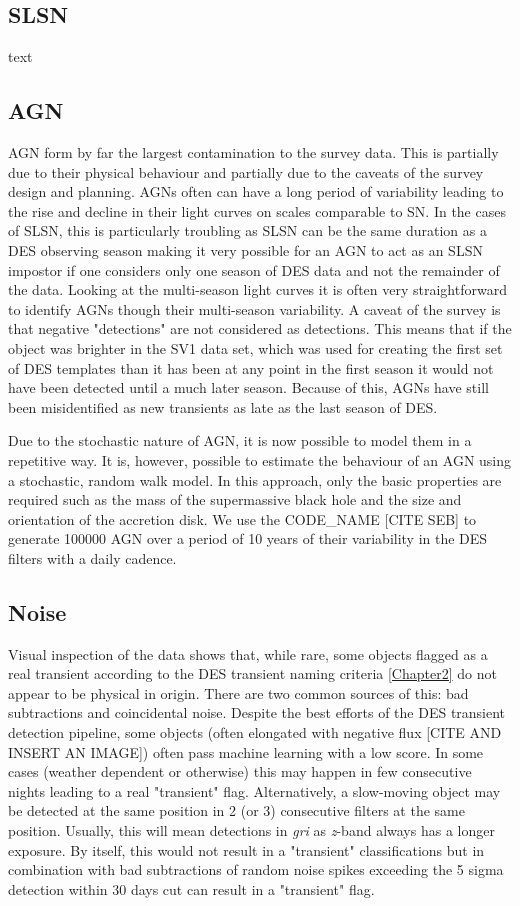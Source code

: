 \subsection{SLSN}
text

\subsection{AGN}
AGN form by far the largest contamination to the survey data. This is partially due to their physical behaviour and partially due to the caveats of the survey design and planning. AGNs often can have a long period of variability leading to the rise and decline in their light curves on scales comparable to SN. In the cases of SLSN, this is particularly troubling as SLSN can be the same duration as a DES observing season making it very possible for an AGN to act as an SLSN impostor if one considers only one season of DES data and not the remainder of the data. Looking at the multi-season light curves it is often very straightforward to identify AGNs though their multi-season variability. A caveat of the survey is that negative "detections" are not considered as detections. This means that if the object was brighter in the SV1 data set, which was used for creating the first set of DES templates than it has been at any point in the first season it would not have been detected until a much later season. Because of this, AGNs have still been misidentified as new transients as late as the last season of DES.

Due to the stochastic nature of AGN, it is now possible to model them in a repetitive way. It is, however, possible to estimate the behaviour of an AGN using a stochastic, random walk model. In this approach, only the basic properties are required such as the mass of the supermassive black hole and the size and orientation of the accretion disk. We use the CODE\_NAME [CITE SEB] to generate 100000 AGN over a period of 10 years of their variability in the DES filters with a daily cadence.

\subsection{Noise}
Visual inspection of the data shows that, while rare, some objects flagged as a real transient according to the DES transient naming criteria \cref{Chapter2} do not appear to be physical in origin. There are two common sources of this: bad subtractions and coincidental noise. Despite the best efforts of the DES transient detection pipeline, some objects (often elongated with negative flux [CITE AND INSERT AN IMAGE]) often pass machine learning with a low score. In some cases (weather dependent or otherwise) this may happen in few consecutive nights leading to a real "transient" flag. Alternatively, a slow-moving object may be detected at the same position in 2 (or 3) consecutive filters at the same position. Usually, this will mean detections in \textit{gri} as \textit{z}-band always has a longer exposure. By itself, this would not result in a "transient" classifications but in combination with bad subtractions of random noise spikes exceeding the 5 sigma detection within 30 days cut can result in a "transient" flag.

